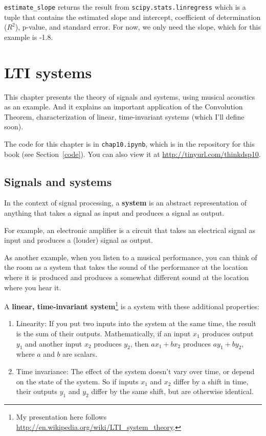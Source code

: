 \documentclass[12pt]{book}
\begin{document}
\verb"estimate_slope" returns the
result from {\tt scipy.stats.linregress} which is a tuple that
contains the estimated slope and intercept, coefficient of
determination ($R^2$), p-value, and standard error.  For now,
we only need the slope, which for this example is -1.8.




\chapter{LTI systems}
\label{systems}

This chapter presents the theory of signals and systems, using
musical acoustics as an example.  And it explains an
important application of the Convolution Theorem, characterization
of linear, time-invariant systems (which I'll define soon).

The code for this chapter is in {\tt chap10.ipynb}, which is in the
repository for this book (see Section~\ref{code}).
You can also view it at \url{http://tinyurl.com/thinkdsp10}.



\section{Signals and systems}

In the context of signal processing, a {\bf system} is an abstract
representation of anything that takes a signal as input and produces
a signal as output.

For example, an electronic amplifier is a circuit that takes an
electrical signal as input and produces a (louder) signal as output.

As another example, when you listen to a musical performance, you
can think of the room as a system that takes the sound of the
performance at the location where it is produced and produces a
somewhat different sound at the location where you hear it.

A {\bf linear, time-invariant system}\footnote{My presentation here
  follows \url{http://en.wikipedia.org/wiki/LTI_system_theory}.} is a
system with these additional properties:

\begin{enumerate}

\item Linearity: If you put two inputs into the system at the same
  time, the result is the sum of their outputs.  Mathematically, if an
  input $x_1$ produces output $y_1$ and another input $x_2$ produces
  $y_2$, then $a x_1 + b x_2$ produces $a y_1 + b y_2$, where $a$ and
  $b$ are scalars.

\item Time invariance: The
  effect of the system doesn't vary over time, or depend on the state
  of the system.  So if inputs $x_1$ and $x_2$ differ by a shift in time,
  their outputs $y_1$ and $y_2$ differ by the same shift, but are otherwise
  identical.

\end{enumerate}
\end{document}
